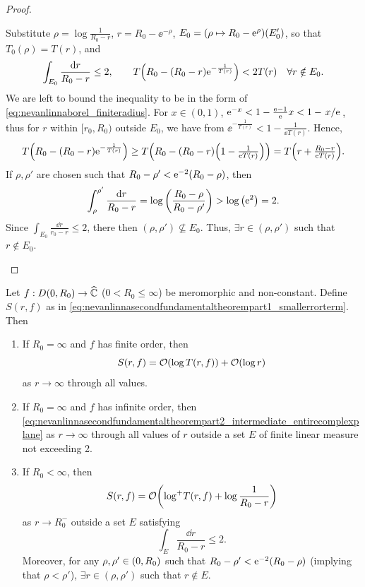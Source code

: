 \begin{proof}
\begin{enumerate}
            Substitute \(\rho=\log\tfrac1{R_0-r}\), \(r=R_0-\ee^{-\rho}\), \(E_0=\qty(\rho\mapsto R_0-\mathrm{e}^{\rho})\qty(E'_0)\), so that \(T_0(\rho)=T(r)\), and \[\int_{E_0}\frac{\dd{r}}{R_0-r}\leq 2,\qquad T\qty(R_0-(R_0-r)\mathrm{e}^{-\frac1{T(r)}})<2T(r)\quad\forall r\notin E_0.\]
            We are left to bound the inequality to be in the form of \cref{eq:nevanlinnaborel_finiteradius}. For \(x\in(0,1)\), \(\ee^{-x}<1-\tfrac{\ee-1}\ee x<1-\flatfrac{x}{\ee}\), thus for \(r\) within \([r_0,R_0)\) outside \(E_0\), we have from \(\ee^{-\frac1{T(r)}}<1-\tfrac{1}{\ee T(r)}\). Hence, \[\textstyle T\qty(R_0-(R_0-r)\mathrm{e}^{-\frac1{T(r)}})\geq T\qty(R_0-(R_0-r)\qty(1-\frac{1}{\mathrm{e} T(r)}))=T\qty(r+\frac{R_0-r}{\mathrm{e} T(r)}).\]
            If \(\rho,\rho'\) are chosen such that \(R_0-\rho'<\mathrm{e}^{-2}\qty(R_0-\rho)\), then \[\int_{\rho}^{\rho'}\frac{\dd{r}}{R_0-r}=\log\qty(\frac{R_0-\rho}{R_0-\rho'})>\log\qty(\mathrm{e}^2)=2.\]
            Since \(\textstyle\int_{E_0}\frac{\dd{r}}{r_0-r}\leq 2\), there then \((\rho,\rho')\not\subseteq E_0\). Thus, \(\exists r\in(\rho,\rho')\) such that \(r\notin E_0\).\qedhere
    \end{enumerate}
\end{proof}
\begin{theorem}[name=\textsc{Second Fundamental Theorem of Nevanlinna Theory, Part 2},store=thm:nevanlinnasecondfundamentaltheorempart2]\label{thm:nevanlinnasecondfundamentaltheorempart2}
    Let \(f:D\qty(0,R_0)\to\widehat{\mathbb{C}}\) (\(0<R_0\leq\infty\)) be meromorphic and non-constant. Define \(S(r,f)\) as in \cref{eq:nevanlinnasecondfundamentaltheorempart1_smallerrorterm}. Then
    \begin{enumerate}
        \item If \(R_0=\infty\) and \(f\) has finite order, then
            \begin{equation}
                S(r,f)=\order{\log T(r,f)}+\order{\log r}\label{eq:nevanlinnasecondfundamentaltheorempart2_intermediate_entirecomplexplane}
            \end{equation} as \(r\to\infty\) through all values.
        \item If \(R_0=\infty\) and \(f\) has infinite order, then \cref{eq:nevanlinnasecondfundamentaltheorempart2_intermediate_entirecomplexplane} as \(r\to\infty\) through all values of \(r\) outside a set \(E\) of finite linear measure not exceeding 2.
        \item If \(R_0<\infty\), then
            \begin{equation}
                S(r,f)=\order{\logp T(r,f)+\log\frac1{R_0-r}}\label{eq:nevanlinnasecondfundamentaltheorempart2_intermediate_largedisk}
            \end{equation}
            as \(r\to R_0^-\) outside a set \(E\) satisfying
            \begin{equation}
                \int_E\frac{\dd{r}}{R_0-r}\leq 2.
            \end{equation}
            Moreover, for any \(\rho,\rho'\in\qty(0,R_0)\) such that \(R_0-\rho'<\mathrm{e}^{-2}\qty(R_0-\rho)\) (implying that \(\rho<\rho'\)), \(\exists r\in(\rho,\rho')\) such that \(r\notin E\).
    \end{enumerate}
\end{theorem}
